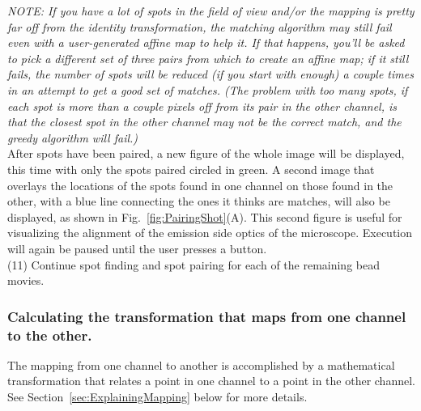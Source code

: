 \documentclass[11pt]{article}
\begin{document}
{\it NOTE: If you have a lot of spots in the field of view and/or the mapping is pretty far off from the identity transformation, the matching algorithm may still fail even with a user-generated affine map to help it.  If that happens, you'll be asked to pick a different set of three pairs from which to create an affine map; if it still fails, the number of spots will be reduced (if you start with enough) a couple times in an attempt to get a good set of matches. (The problem with too many spots, if each spot is more than a couple pixels off from its pair in the other channel, is that the closest spot in the other channel may not be the correct match, and the greedy algorithm will fail.)}\\

\noindent After spots have been paired, a new figure of the whole image will be displayed, this time with only the spots paired circled in green.  A second image that overlays the locations of the spots found in one channel on those found in the other, with a blue line connecting the ones it thinks are matches, will also be displayed, as shown in Fig.~\ref{fig:PairingShot}(A). This second figure is useful for visualizing the alignment of the emission side optics of the microscope.  Execution will again be paused until the user presses a button.\\

\noindent (11) Continue spot finding and spot pairing for each of the remaining bead movies.

\subsubsection{Calculating the transformation that maps from one channel to the other.}

The mapping from one channel to another is accomplished by a mathematical transformation that relates a point in one channel to a point in the other channel. See Section~\ref{sec:ExplainingMapping} below for more details. \\
\end{document}
